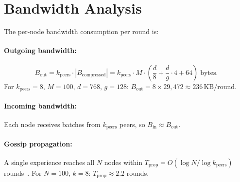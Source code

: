 \section{Bandwidth Analysis}

\label{app:bandwidth}

The per-node bandwidth consumption per round is:

\paragraph{Outgoing bandwidth:}
\begin{equation}
    B_{\text{out}} = k_{\text{peers}} \cdot |B_{\text{compressed}}|
    = k_{\text{peers}} \cdot M \cdot \left(\frac{d}{8} + \frac{d}{g} \cdot 4 + 64\right) \; \text{bytes}.
\end{equation}
For $k_{\text{peers}} = 8$, $M = 100$, $d = 768$, $g = 128$:
$B_{\text{out}} = 8 \times 29{,}472 \approx 236\,\text{KB/round}$.

\paragraph{Incoming bandwidth:}
Each node receives batches from $k_{\text{peers}}$ peers, so
$B_{\text{in}} \approx B_{\text{out}}$.

\paragraph{Gossip propagation:}
A single experience reaches all $N$ nodes within
$T_{\text{prop}} = O(\log N / \log k_{\text{peers}})$ rounds~\cite{demers1987epidemic}.
For $N = 100$, $k = 8$: $T_{\text{prop}} \approx 2.2$ rounds.

